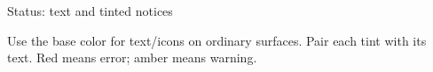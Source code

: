 \begin{standardframe}{Status: text and tinted notices}

\medskip\par Use the base color for text/icons on ordinary surfaces. Pair each  tint with its  text. Red means error; amber means warning.
\end{standardframe}
